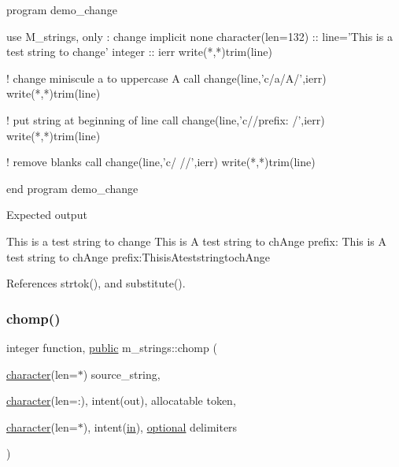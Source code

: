 \begin{DoxyVerb}program demo_change

 use M_strings, only : change
 implicit none
 character(len=132) :: line='This is a test string to change'
 integer            :: ierr
    write(*,*)trim(line)

    ! change miniscule a to uppercase A
    call change(line,'c/a/A/',ierr)
    write(*,*)trim(line)

    ! put string at beginning of line
    call change(line,'c//prefix: /',ierr)
    write(*,*)trim(line)

    ! remove blanks
    call change(line,'c/ //',ierr)
    write(*,*)trim(line)

end program demo_change

Expected output

 This is a test string to change
 This is A test string to chAnge
 prefix: This is A test string to chAnge
 prefix:ThisisAteststringtochAnge \end{DoxyVerb}
 

References strtok(), and substitute().

\mbox{\label{namespacem__strings_aa3fc15a665eeff512b7f5269029f558d}} 
\subsubsection{\texorpdfstring{chomp()}{chomp()}}
{\footnotesize\ttfamily integer function, \hyperlink{M__stopwatch_83_8txt_a2f74811300c361e53b430611a7d1769f}{public} m\+\_\+strings\+::chomp (\begin{DoxyParamCaption}\item[{\hyperlink{option__stopwatch_83_8txt_abd4b21fbbd175834027b5224bfe97e66}{character}(len=$\ast$)}]{source\+\_\+string,  }\item[{\hyperlink{option__stopwatch_83_8txt_abd4b21fbbd175834027b5224bfe97e66}{character}(len=\+:), intent(out), allocatable}]{token,  }\item[{\hyperlink{option__stopwatch_83_8txt_abd4b21fbbd175834027b5224bfe97e66}{character}(len=$\ast$), intent(\hyperlink{M__journal_83_8txt_afce72651d1eed785a2132bee863b2f38}{in}), \hyperlink{option__stopwatch_83_8txt_aa4ece75e7acf58a4843f70fe18c3ade5}{optional}}]{delimiters }\end{DoxyParamCaption})}



